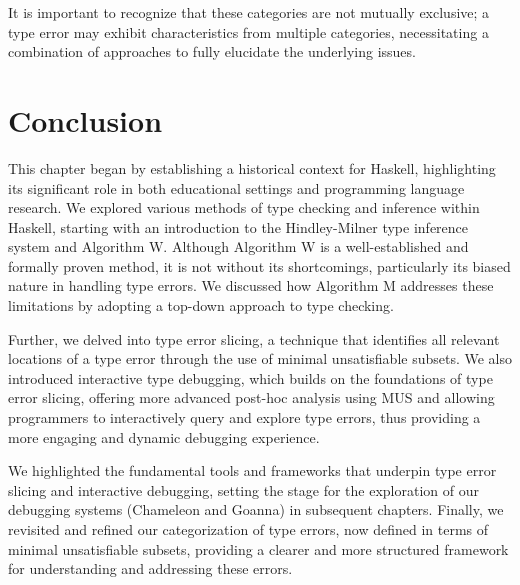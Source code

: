 It is important to recognize that these categories are not mutually exclusive; a type error may exhibit characteristics from multiple categories, necessitating a combination of approaches to fully elucidate the underlying issues.

\section{Conclusion}

This chapter began by establishing a historical context for Haskell, highlighting its significant role in both educational settings and programming language research. We explored various methods of type checking and inference within Haskell, starting with an introduction to the Hindley-Milner type inference system and Algorithm W. Although Algorithm W is a well-established and formally proven method, it is not without its shortcomings, particularly its biased nature in handling type errors. We discussed how Algorithm M addresses these limitations by adopting a top-down approach to type checking.

Further, we delved into type error slicing, a technique that identifies all relevant locations of a type error through the use of minimal unsatisfiable subsets. We also introduced interactive type debugging, which builds on the foundations of type error slicing, offering more advanced post-hoc analysis using MUS and allowing programmers to interactively query and explore type errors, thus providing a more engaging and dynamic debugging experience.

We highlighted the fundamental tools and frameworks that underpin type error slicing and interactive debugging, setting the stage for the exploration of our debugging systems (Chameleon and Goanna) in subsequent chapters. Finally, we revisited and refined our categorization of type errors, now defined in terms of minimal unsatisfiable subsets, providing a clearer and more structured framework for understanding and addressing these errors.
